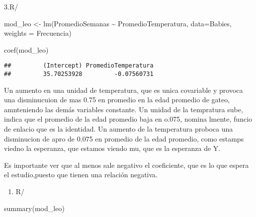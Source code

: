 \documentclass[
]{article}
\newenvironment{Shaded}{\begin{snugshade}}{\end{snugshade}}
\newcommand{\AttributeTok}[1]{\textcolor[rgb]{0.77,0.63,0.00}{#1}}
\newcommand{\CommentTok}[1]{\textcolor[rgb]{0.56,0.35,0.01}{\textit{#1}}}
\newcommand{\FunctionTok}[1]{\textcolor[rgb]{0.00,0.00,0.00}{#1}}
\newcommand{\NormalTok}[1]{#1}
\newcommand{\OtherTok}[1]{\textcolor[rgb]{0.56,0.35,0.01}{#1}}
\newcommand{\SpecialCharTok}[1]{\textcolor[rgb]{0.00,0.00,0.00}{#1}}
\providecommand{\tightlist}{%
  \setlength{\itemsep}{0pt}\setlength{\parskip}{0pt}}
\begin{document}
\begin{Shaded}
\end{Shaded}

3.R/

\begin{Shaded}
\begin{Highlighting}[]
\NormalTok{mod\_leo }\OtherTok{\textless{}{-}}  \FunctionTok{lm}\NormalTok{(PromedioSemanas }\SpecialCharTok{\textasciitilde{}}\NormalTok{ PromedioTemperatura, }\AttributeTok{data=}\NormalTok{Babies, }\AttributeTok{weights =}\NormalTok{ Frecuencia)}

\FunctionTok{coef}\NormalTok{(mod\_leo)}
\end{Highlighting}
\end{Shaded}

\begin{verbatim}
##         (Intercept) PromedioTemperatura 
##         35.70253928         -0.07560731
\end{verbatim}

Un aumento en una unidad de temperatura, que es unica covariable y
provoca una disminucuion de mas 0.75 en promedio en la edad promedio de
gateo, amnteniendo las demás variables constante. Un unidad de la
tempratura sube, indica que el promedio de la edad promedio baja en
o.075, nomina lmente, funcio de enlacio que es la identidad. Un aumento
de la temperatura proboca una disminucion de apro de 0.075 en promedio
de la edad promedio, como estamps viedno la esperanza, que estamos
viendo mu, que es la esperanza de Y.

Es importante ver que al menos sale negativo el coeficiente, que es lo
que espera el estudio,puesto que tienen una relación negativa.

\begin{enumerate}
\def\labelenumi{\arabic{enumi}.}
\setcounter{enumi}{3}
\tightlist
\item
  R/
\end{enumerate}

\begin{Shaded}
\begin{Highlighting}[]
\FunctionTok{summary}\NormalTok{(mod\_leo)}
\end{Highlighting}
\end{Shaded}
\end{document}
